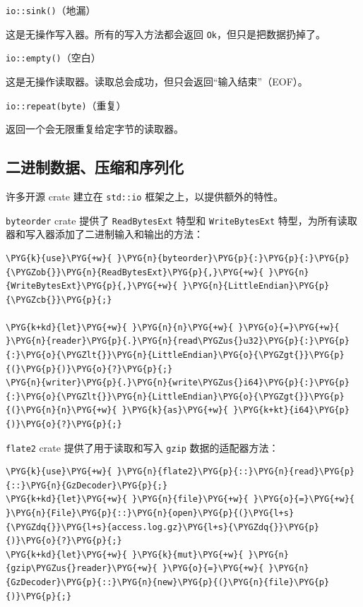 \begin{mySidenote}
\texttt{io::sink()}（地漏）
\end{mySidenote}

这是无操作写入器。所有的写入方法都会返回 \texttt{Ok}，但只是把数据扔掉了。

\begin{mySidenote}
\texttt{io::empty()}（空白）
\end{mySidenote}

这是无操作读取器。读取总会成功，但只会返回“输入结束”（EOF）。

\begin{mySidenote}
\texttt{io::repeat(byte)}（重复）
\end{mySidenote}

返回一个会无限重复给定字节的读取器。

\subsection{二进制数据、压缩和序列化}

许多开源 crate 建立在 \texttt{std::io} 框架之上，以提供额外的特性。

\texttt{byteorder} crate 提供了 \texttt{ReadBytesExt} 特型和 \texttt{WriteBytesExt} 特型，为所有读取器和写入器添加了二进制输入和输出的方法：

\begin{Verbatim}[commandchars=\\\{\},breaklines=true,breakanywhere=true,fontsize=\codefont,xleftmargin=17bp]
\PYG{k}{use}\PYG{+w}{ }\PYG{n}{byteorder}\PYG{p}{:}\PYG{p}{:}\PYG{p}{\PYGZob{}}\PYG{n}{ReadBytesExt}\PYG{p}{,}\PYG{+w}{ }\PYG{n}{WriteBytesExt}\PYG{p}{,}\PYG{+w}{ }\PYG{n}{LittleEndian}\PYG{p}{\PYGZcb{}}\PYG{p}{;}

\PYG{k+kd}{let}\PYG{+w}{ }\PYG{n}{n}\PYG{+w}{ }\PYG{o}{=}\PYG{+w}{ }\PYG{n}{reader}\PYG{p}{.}\PYG{n}{read\PYGZus{}u32}\PYG{p}{:}\PYG{p}{:}\PYG{o}{\PYGZlt{}}\PYG{n}{LittleEndian}\PYG{o}{\PYGZgt{}}\PYG{p}{(}\PYG{p}{)}\PYG{o}{?}\PYG{p}{;}
\PYG{n}{writer}\PYG{p}{.}\PYG{n}{write\PYGZus{}i64}\PYG{p}{:}\PYG{p}{:}\PYG{o}{\PYGZlt{}}\PYG{n}{LittleEndian}\PYG{o}{\PYGZgt{}}\PYG{p}{(}\PYG{n}{n}\PYG{+w}{ }\PYG{k}{as}\PYG{+w}{ }\PYG{k+kt}{i64}\PYG{p}{)}\PYG{o}{?}\PYG{p}{;}
\end{Verbatim}

\texttt{flate2} crate 提供了用于读取和写入 \texttt{gzip} 数据的适配器方法：

\begin{Verbatim}[commandchars=\\\{\},breaklines=true,breakanywhere=true,fontsize=\codefont,xleftmargin=17bp]
\PYG{k}{use}\PYG{+w}{ }\PYG{n}{flate2}\PYG{p}{::}\PYG{n}{read}\PYG{p}{::}\PYG{n}{GzDecoder}\PYG{p}{;}
\PYG{k+kd}{let}\PYG{+w}{ }\PYG{n}{file}\PYG{+w}{ }\PYG{o}{=}\PYG{+w}{ }\PYG{n}{File}\PYG{p}{::}\PYG{n}{open}\PYG{p}{(}\PYG{l+s}{\PYGZdq{}}\PYG{l+s}{access.log.gz}\PYG{l+s}{\PYGZdq{}}\PYG{p}{)}\PYG{o}{?}\PYG{p}{;}
\PYG{k+kd}{let}\PYG{+w}{ }\PYG{k}{mut}\PYG{+w}{ }\PYG{n}{gzip\PYGZus{}reader}\PYG{+w}{ }\PYG{o}{=}\PYG{+w}{ }\PYG{n}{GzDecoder}\PYG{p}{::}\PYG{n}{new}\PYG{p}{(}\PYG{n}{file}\PYG{p}{)}\PYG{p}{;}
\end{Verbatim}

